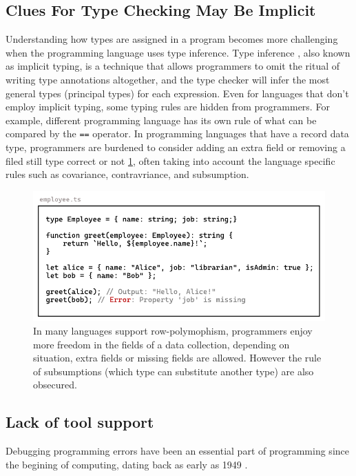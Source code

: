 \subsection{Clues For Type Checking May Be Implicit}
Understanding how types are assigned in a program becomes more challenging when the programming language uses type inference. Type inference \cite{Damas1982-sc},  also known as implicit typing, is a technique that allows programmers to omit the ritual of writing type annotations altogether, and the type checker will infer the most general types (principal types) for each expression. Even for languages that don't employ implicit typing, some typing rules are hidden from programmers.
For example, different programming language has its own rule of what can be compared by the \texttt{==} operator. In programming languages that have a record data type, programmers are burdened to consider adding an extra field or removing a filed still type correct or not \ref{fig:row-polymophism}, often taking into account the language specific rules such as covariance, contravriance, and subsumption.

\begin{figure}[hbt]
  \includegraphics[width=\linewidth]{RowPolymorphism.pdf}
  \caption{
    \label{fig:row-polymophism}
   In many languages support row-polymophism, programmers enjoy more freedom in the fields of a data collection,  depending on situation,  extra fields or missing fields are allowed. However the rule of subsumptions (which type can substitute another type) are also obsecured.
    }
\end{figure}


\subsection{Lack of tool support}
Debugging programming errors have been an essential part of programming since the begining of computing, dating back as early as 1949 \cite{Campbell-Kelly1992-rn}. 

